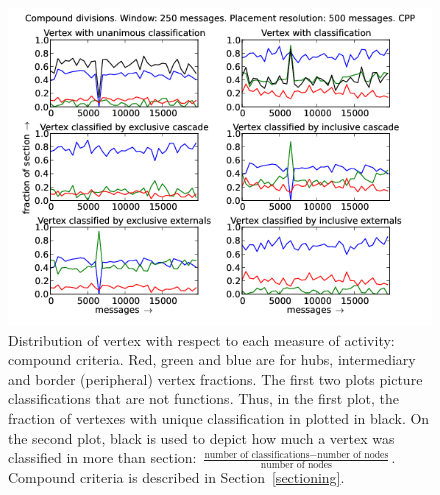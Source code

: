 \documentclass[%
 aip,
 jmp,%
 amsmath,amssymb,
 reprint,%
]{revtex4-1}
\begin{document}
\begin{figure}[hbtp] 
   \centering
        \includegraphics[width=\textwidth]{figs/CPP/250_2}
    \caption{Distribution of vertex with respect to each measure of activity: compound criteria. Red, green and blue are for hubs, intermediary and border (peripheral) vertex fractions. The first two plots picture classifications that are not functions. Thus, in the first plot, the fraction of vertexes with unique classification in plotted in black. On the second plot, black is used to depict how much a vertex was classified in more than section: $\frac{\text{number of classifications} - \text{number of nodes}}{\text{number of nodes}}$. Compound criteria is described in Section~\ref{sectioning}.}
    \label{fig:cpp250_}
\end{figure}
\end{document}
